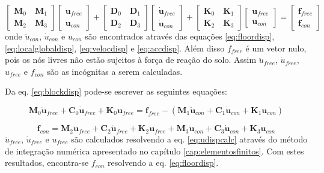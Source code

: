 \begin{equation} \label{eq:blockdisp}
 \begin{bmatrix}
        \pmb{M}_0 \quad \pmb{M}_1 \\
        \pmb{M}_2 \quad \pmb{M}_3
\end{bmatrix}
 \begin{bmatrix}
   \ddot{\pmb{u}}_{free} \\
   \ddot{\pmb{u}}_{con} 
\end{bmatrix}    
+ \begin{bmatrix}
        \pmb{D}_0 \quad \pmb{D}_1 \\
        \pmb{D}_2 \quad \pmb{D}_3
     \end{bmatrix}
     \begin{bmatrix}
        \dot{\pmb{u}}_{free} \\
        \dot{\pmb{u}}_{con} 
     \end{bmatrix}
+ \begin{bmatrix}
        \pmb{K}_0 \quad \pmb{K}_1 \\
        \pmb{K}_2 \quad \pmb{K}_3
     \end{bmatrix}
     \begin{bmatrix}
        \pmb{u}_{free} \\
        \pmb{u}_{con} 
     \end{bmatrix} =
     \begin{bmatrix}
        \pmb{f}_{free} \\
        \pmb{f}_{con} 
\end{bmatrix}
\end{equation}
onde $\ddot{u}_{con}$, $\dot{u}_{con}$ e $u_{con}$ são encontrados através das equações \ref{eq:floordisp}, \ref{eq:localglobaldisp}, \ref{eq:velocdisp} e \ref{eq:accdisp}. Além disso $f_{free}$ é um vetor nulo, pois os nós livres não estão sujeitos à força de reação do solo.
Assim $\ddot{u}_{free}$, $\dot{u}_{free}$, $u_{free}$ e $f_{con}$ são as incógnitas a serem calculadas.

Da eq. \ref{eq:blockdisp} pode-se escrever as seguintes equações:

\begin{equation} \label{eq:udispcalc}
    \pmb{M}_0\ddot{\pmb{u}}_{free} +  \pmb{C}_0\dot{\pmb{u}}_{free} +  \pmb{K}_0\pmb{u}_{free} = \pmb{f}_{free} - (\pmb{M}_1\ddot{\pmb{u}}_{con} +  \pmb{C}_1\dot{\pmb{u}}_{con} +  \pmb{K}_1\pmb{u}_{con}) 
\end{equation}

\begin{equation} \label{fdispcalc}
    \pmb{f}_{con} =  \pmb{M}_2\ddot{\pmb{u}}_{free} +  
    \pmb{C}_2\dot{\pmb{u}}_{free} +  \pmb{K}_2\pmb{u}_{free} + 
    \pmb{M}_3\ddot{\pmb{u}}_{con} +  \pmb{C}_3\dot{\pmb{u}}_{con} + \pmb{K}_3\pmb{u}_{con}
\end{equation}
$\ddot{u}_{free}$, $\dot{u}_{free}$ e $u_{free}$ são calculados resolvendo a eq. \ref{eq:udispcalc} através do método de integração numérica apresentado no capítulo \ref{cap:elementosfinitos}. Com estes resultados, encontra-se $f_{con}$ resolvendo a eq. \ref{eq:floordisp}.
 

